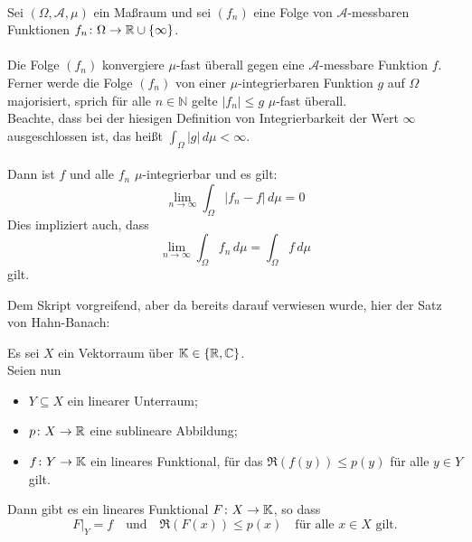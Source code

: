 ~

\begin{satznbfr}[Lebesgue]  \label{satz:x-SatzvonLebesgue}
Sei $(\Omega,\mathcal{A},\mu)$ ein Maßraum und sei $\left(f_n\right)$ eine Folge von $\mathcal{A}$-messbaren Funktionen $f_n \colon \Omega\rightarrow\mathbb{R}\cup\{\infty\}$. \\ \\
Die Folge $\left( f_n \right)$ konvergiere $\mu$-fast überall gegen eine $\mathcal{A}$-messbare Funktion $f$. Ferner werde die Folge $\left(f_n\right)$ von einer $\mu$-integrierbaren Funktion $g$ auf $\Omega$ majorisiert, sprich für alle $n \in \mathbb{N}$ gelte $|f_{n}| \leq g$ $\mu$-fast überall. \\
Beachte, dass bei der hiesigen Definition von Integrierbarkeit der Wert $\infty$ ausgeschlossen ist, das heißt $\int_\Omega|g|\,d\mu < \infty$. \\ \\
Dann ist $f$ und alle $f_n$ $\mu$-integrierbar und es gilt:
	\[ \lim_{n \rightarrow \infty}\int_\Omega{|f_n - f|}\,d\mu = 0 \]
Dies impliziert auch, dass
	\[ \lim_{n \rightarrow \infty}\int_\Omega{f_n\,}d\mu = \int_\Omega{f\,}d\mu \]
gilt.
\end{satznbfr}


Dem Skript vorgreifend, aber da bereits darauf verwiesen wurde, hier der Satz von Hahn-Banach:


\begin{satznbfr}  \label{satz:x-hahn-banach}
	Es sei $X$ ein Vektorraum über $\mathbb{K} \in \{ \mathbb{R}, \mathbb{C} \}$. \\
	Seien nun
	\begin{itemize}
		\item $Y \subseteq X$ ein linearer Unterraum;
		\item $p \colon X \rightarrow \mathbb{R}$ eine sublineare Abbildung;
		\item $f \colon Y \rightarrow \mathbb{K}$ ein lineares Funktional, für das $\Re(f(y)) \leq p(y)$ für alle $y \in Y$ gilt.
	\end{itemize}
	Dann gibt es ein lineares Funktional $F \colon X \rightarrow \mathbb{K}$, so dass
	\[ F|_{Y} = f \quad \text{und} \quad \Re(F(x)) \leq p(x) \quad \text{für alle } x \in X \text{ gilt.} \]
\end{satznbfr}



\newpage
